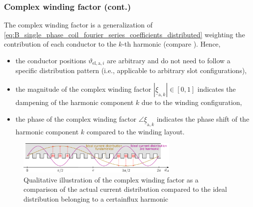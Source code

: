 \begin{frame}
	\frametitle{Complex winding factor (cont.)}
    The complex winding factor is a generalization of \eqref{eq:B_single_phase_coil_fourier_series_coefficients_distributed} weighting the contribution of each conductor to the $k$-th harmonic (compare ). Hence,
    \begin{itemize}
        \item the conductor positions $\vartheta_{\mathrm{el},\mathrm{a},i}$ are arbitrary and do not need to follow a specific distribution pattern (i.e., applicable to arbitrary slot configurations),
        \item the magnitude of the complex winding factor $|\underline{\xi}_{\mathrm{a},k}|\in[0,1]$ indicates the dampening of the harmonic component $k$ due to the winding configuration,
        \item the phase of the complex winding factor $\angle \underline{\xi}_{\mathrm{a},k}$ indicates the phase shift of the harmonic component $k$ compared to the winding layout. 
    \end{itemize}

    \begin{figure}
        \centering
        \includegraphics[width=0.7\textwidth]{fig/lec05/Representation_complex_winding_factor.pdf}
        \caption{Qualitative illustration of the complex winding factor as a comparison of the actual current distribution compared to the ideal distribution belonging to a certainflux harmonic}
        \label{fig:Representation_complex_winding_factor}
    \end{figure}
\end{frame}